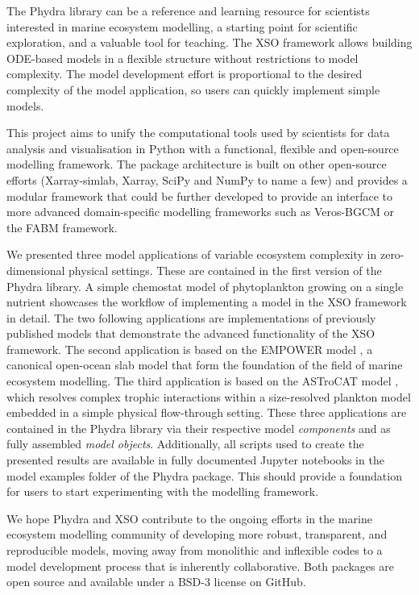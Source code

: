 \documentclass[journal abbreviation, manuscript]{copernicus}
\begin{document}
The Phydra library can be a reference and learning resource for scientists interested in marine ecosystem modelling, a starting point for scientific exploration, and a valuable tool for teaching. The XSO framework allows building ODE-based models in a flexible structure without restrictions to model complexity. The model development effort is proportional to the desired complexity of the model application, so users can quickly implement simple models.

This project aims to unify the computational tools used by scientists for data analysis and visualisation in Python with a functional, flexible and open-source modelling framework. The package architecture is built on other open-source efforts (Xarray-simlab, Xarray, SciPy and NumPy to name a few) and provides a modular framework that could be further developed to provide an interface to more advanced domain-specific modelling frameworks such as Veros-BGCM or the FABM framework.

We presented three model applications of variable ecosystem complexity in zero-dimensional physical settings. These are contained in the first version of the Phydra library. A simple chemostat model of phytoplankton growing on a single nutrient showcases the workflow of implementing a model in the XSO framework in detail. The two following applications are implementations of previously published models that demonstrate the advanced functionality of the XSO framework. The second application is based on the EMPOWER model \citep{Anderson2015c}, a canonical open-ocean slab model that form the foundation of the field of marine ecosystem modelling. The third application is based on the ASTroCAT model \citep{Banas2011b}, which resolves complex trophic interactions within a size-resolved plankton model embedded in a simple physical flow-through setting. These three applications are contained in the Phydra library via their respective model \textit{components} and as fully assembled \textit{model objects}. Additionally, all scripts used to create the presented results are available in fully documented Jupyter notebooks in the model examples folder of the Phydra package. This should provide a foundation for users to start experimenting with the modelling framework. 

We hope Phydra and XSO contribute to the ongoing efforts in the marine ecosystem modelling community of developing more robust, transparent, and reproducible models, moving away from monolithic and inflexible codes to a model development process that is inherently collaborative. Both packages are open source and available under a BSD-3 license on GitHub.
\end{document}
